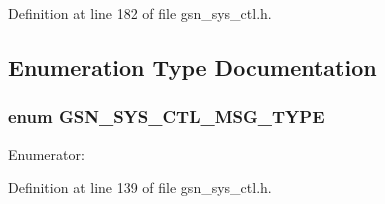 Definition at line 182 of file gsn\_\-sys\_\-ctl.h.



\subsection{Enumeration Type Documentation}
\hypertarget{a00592_a9db34a7470eae0600850f44d6d4101bb}{
\subsubsection[{GSN\_\-SYS\_\-CTL\_\-MSG\_\-TYPE}]{\setlength{\rightskip}{0pt plus 5cm}enum {\bf GSN\_\-SYS\_\-CTL\_\-MSG\_\-TYPE}}}
\label{a00592_a9db34a7470eae0600850f44d6d4101bb}
\begin{Desc}
\item[Enumerator: ]\par
\begin{description}
\item[{\em 
\hypertarget{a00592_a9db34a7470eae0600850f44d6d4101bba813f1a2677354f48150de5a64dbe9920}{
GSN\_\-SYS\_\-CTL\_\-MSG\_\-TYPE\_\-FILE\_\-OP\_\-REQ}
\label{a00592_a9db34a7470eae0600850f44d6d4101bba813f1a2677354f48150de5a64dbe9920}
}]\end{description}
\end{Desc}



Definition at line 139 of file gsn\_\-sys\_\-ctl.h.

